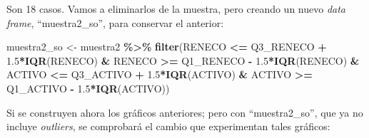 \documentclass[
]{book}
\newenvironment{Shaded}{\begin{snugshade}}{\end{snugshade}}
\newcommand{\FloatTok}[1]{\textcolor[rgb]{0.00,0.00,0.81}{#1}}
\newcommand{\FunctionTok}[1]{\textcolor[rgb]{0.13,0.29,0.53}{\textbf{#1}}}
\newcommand{\NormalTok}[1]{#1}
\newcommand{\OtherTok}[1]{\textcolor[rgb]{0.56,0.35,0.01}{#1}}
\newcommand{\SpecialCharTok}[1]{\textcolor[rgb]{0.81,0.36,0.00}{\textbf{#1}}}
\begin{document}
Son 18 casos. Vamos a eliminarlos de la muestra, pero creando un nuevo \emph{data frame}, ``muestra2\_so'', para conservar el anterior:

\begin{Shaded}
\begin{Highlighting}[]
\NormalTok{muestra2\_so }\OtherTok{\textless{}{-}}\NormalTok{ muestra2 }\SpecialCharTok{\%\textgreater{}\%}
  \FunctionTok{filter}\NormalTok{(RENECO }\SpecialCharTok{\textless{}=}\NormalTok{ Q3\_RENECO }\SpecialCharTok{+} \FloatTok{1.5}\SpecialCharTok{*}\FunctionTok{IQR}\NormalTok{(RENECO) }\SpecialCharTok{\&}
\NormalTok{           RENECO }\SpecialCharTok{\textgreater{}=}\NormalTok{ Q1\_RENECO }\SpecialCharTok{{-}} \FloatTok{1.5}\SpecialCharTok{*}\FunctionTok{IQR}\NormalTok{(RENECO) }\SpecialCharTok{\&}
\NormalTok{           ACTIVO }\SpecialCharTok{\textless{}=}\NormalTok{ Q3\_ACTIVO }\SpecialCharTok{+} \FloatTok{1.5}\SpecialCharTok{*}\FunctionTok{IQR}\NormalTok{(ACTIVO) }\SpecialCharTok{\&}
\NormalTok{           ACTIVO }\SpecialCharTok{\textgreater{}=}\NormalTok{ Q1\_ACTIVO }\SpecialCharTok{{-}} \FloatTok{1.5}\SpecialCharTok{*}\FunctionTok{IQR}\NormalTok{(ACTIVO))}
\end{Highlighting}
\end{Shaded}

Si se construyen ahora los gráficos anteriores; pero con ``muestra2\_so'', que ya no incluye \emph{outliers}, se comprobará el cambio que experimentan tales gráficos:
\end{document}
